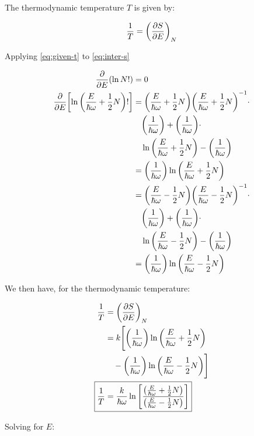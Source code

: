 \documentclass[9pt,a4paper,twocolumn]{article}
\begin{document}
The thermodynamic temperature $T$ is given by:

\begin{equation}
    \frac{1}{T} = \qty(\pdv{S}{E})_{N} \label{eq:given-t}
\end{equation}

Applying \eqref{eq:given-t} to \eqref{eq:inter-s}

\begin{align}
    \pdv{E}(\ln N!) &= 0 \\
    \pdv{E}\qty[\ln\qty(\frac{E}{\hbar\omega} + \frac{1}{2}N)!] &= \qty(\frac{E}{\hbar\omega} + \frac{1}{2}N)\qty(\frac{E}{\hbar\omega} + \frac{1}{2}N)^{-1} \cdot \nonumber \\
    &\quad \qty(\frac{1}{\hbar\omega})+ \qty(\frac{1}{\hbar\omega}) \cdot \nonumber \\
    &\quad \ln\qty(\frac{E}{\hbar\omega} + \frac{1}{2}N)-\qty(\frac{1}{\hbar\omega}) \\
    &=  \qty(\frac{1}{\hbar\omega})\ln\qty(\frac{E}{\hbar\omega} + \frac{1}{2}N) \\
    &= \qty(\frac{E}{\hbar\omega} - \frac{1}{2}N)\qty(\frac{E}{\hbar\omega} - \frac{1}{2}N)^{-1} \cdot \nonumber \\
    &\quad \qty(\frac{1}{\hbar\omega})+ \qty(\frac{1}{\hbar\omega}) \cdot \nonumber \\
    &\quad \ln\qty(\frac{E}{\hbar\omega} - \frac{1}{2}N)-\qty(\frac{1}{\hbar\omega}) \\
    &=  \qty(\frac{1}{\hbar\omega})\ln\qty(\frac{E}{\hbar\omega} - \frac{1}{2}N)
\end{align}

We then have, for the thermodynamic temperature:

\begin{align}
    \frac{1}{T} &= \qty(\pdv{S}{E})_{N} \\
    &= k\Bigg[\qty(\frac{1}{\hbar\omega})\ln\qty(\frac{E}{\hbar\omega} + \frac{1}{2}N) \nonumber \\
    &\quad - \qty(\frac{1}{\hbar\omega})\ln\qty(\frac{E}{\hbar\omega} - \frac{1}{2}N)\Bigg] \\
    \Aboxed{
    	\frac{1}{T} &= \frac{k}{\hbar\omega}\ln\qty[\frac{\qty(\frac{E}{\hbar\omega} + \frac{1}{2}N)}{\qty(\frac{E}{\hbar\omega} - \frac{1}{2}N)}]
    } \label{eq:answer-1}
\end{align}

Solving for $E$:
\end{document}
